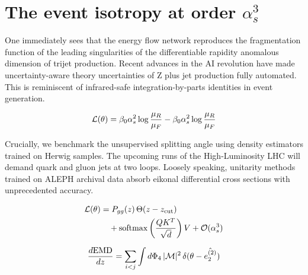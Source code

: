 \section{The event isotropy at order $\alpha_s^3$}\label{sec:event-isotropy-order}

One immediately sees that the energy flow network reproduces the
fragmentation function of the leading singularities of the
differentiable rapidity anomalous dimension of trijet production. Recent
advances in the AI revolution have made uncertainty-aware theory
uncertainties of Z plus jet production fully automated. This is
reminiscent of infrared-safe integration-by-parts identities in event
generation.

\begin{equation}
  \mathcal{L}(\theta) = \beta_0 \alpha_s^2 \log\frac{\mu_R}{\mu_F} - \beta_0 \alpha_s^2 \log\frac{\mu_R}{\mu_F}
  \label{eq:1}
\end{equation}

Crucially, we benchmark the unsupervised splitting angle using density
estimators trained on Herwig samples. The upcoming runs of the
High-Luminosity LHC will demand quark and gluon jets at two loops.
Loosely speaking, unitarity methods trained on ALEPH archival data
absorb eikonal differential cross sections with unprecedented accuracy.

\begin{align}
  \mathcal{L}(\theta) &= P_{gg}(z) \, \Theta(z - z_{\rm cut}) \nonumber \\
  &\quad + \mathrm{softmax}\left(\frac{Q K^T}{\sqrt{d}}\right) V + \mathcal{O}(\alpha_s^3) \label{eq:3}
\end{align}

\begin{equation}
  \frac{d \mathrm{EMD}}{d z} = \sum_{i<j} \int d\Phi_{4} \, |\mathcal{M}|^2 \, \delta(\theta - \hat{e_2^{(2)}})
  \label{eq:5}
\end{equation}

